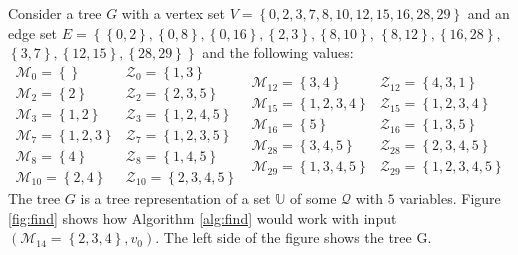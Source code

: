 Consider a tree $G$ with a vertex set
$V=\left\{0,2,3,7,8,10,12,15,16,28,29\right\}$
and an edge set
$E = \left\{\left\{0,2\right\}, \left\{0,8\right\}, \left\{0,16\right\},
\left\{2,3\right\}, \left\{8,10\right\}\right.$, $\left.\left\{8,12\right\},
\left\{16,28\right\},\right.$
$\left.\left\{3,7\right\}, \left\{12,15\right\},
\left\{28,29\right\}\right\}$
and the following values:
\[
    \begin{array}{ll}
        \mathcal{M}_0    = \left\{{}\right\}           & \mathcal{Z}_0    = \left\{{1,3}\right\} \\
        \mathcal{M}_2    = \left\{{2}\right\}          & \mathcal{Z}_2    = \left\{{2,3,5}\right\} \\
        \mathcal{M}_3    = \left\{{1,2}\right\}        & \mathcal{Z}_3    = \left\{{1,2,4,5}\right\} \\
        \mathcal{M}_7    = \left\{{1,2,3}\right\}      & \mathcal{Z}_7    = \left\{{1,2,3,5}\right\} \\
        \mathcal{M}_8    = \left\{{4}\right\}          & \mathcal{Z}_8    = \left\{{1,4,5}\right\} \\
        \mathcal{M}_{10} = \left\{{2,4}\right\}        & \mathcal{Z}_{10} = \left\{{2,3,4,5}\right\}
    \end{array}
~
    \begin{array}{ll}
        \mathcal{M}_{12} = \left\{{3,4}\right\}        & \mathcal{Z}_{12} = \left\{{4,3,1}\right\} \\
        \mathcal{M}_{15} = \left\{{1,2,3,4}\right\}    & \mathcal{Z}_{15} = \left\{{1,2,3,4}\right\} \\
        \mathcal{M}_{16} = \left\{{5}\right\}          & \mathcal{Z}_{16} = \left\{{1,3,5}\right\} \\
        \mathcal{M}_{28} = \left\{{3,4,5}\right\}      & \mathcal{Z}_{28} = \left\{{2,3,4,5}\right\} \\
        \mathcal{M}_{29} = \left\{{1,3,4,5}\right\}    & \mathcal{Z}_{29} = \left\{{1,2,3,4,5}\right\}
    \end{array}
\]
The tree $G$ is a tree representation of a set $\mathbb{U}$ of some
$\mathcal{Q}$ with $5$ variables.
Figure \ref{fig:find} shows how Algorithm \ref{alg:find} would work with input
$(\mathcal{M}_{14} = \left\{{2,3,4}\right\}, v_0)$.
The left side of the figure shows the tree G.

